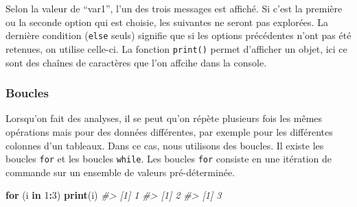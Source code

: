 \documentclass[]{article}
\newenvironment{Shaded}{\begin{snugshade}}{\end{snugshade}}
\newcommand{\CommentTok}[1]{\textcolor[rgb]{0.56,0.35,0.01}{\textit{#1}}}
\newcommand{\ControlFlowTok}[1]{\textcolor[rgb]{0.13,0.29,0.53}{\textbf{#1}}}
\newcommand{\DecValTok}[1]{\textcolor[rgb]{0.00,0.00,0.81}{#1}}
\newcommand{\KeywordTok}[1]{\textcolor[rgb]{0.13,0.29,0.53}{\textbf{#1}}}
\newcommand{\NormalTok}[1]{#1}
\newcommand{\OperatorTok}[1]{\textcolor[rgb]{0.81,0.36,0.00}{\textbf{#1}}}
\newcommand{\StringTok}[1]{\textcolor[rgb]{0.31,0.60,0.02}{#1}}
\begin{document}
\begin{Shaded}
\end{Shaded}

Selon la valeur de ``var1'', l'un des trois messages est affiché.
Si c'est la première ou la seconde option qui est choisie, les suivantes ne seront pas explorées. La dernière condition (\texttt{else} seuls) signifie que si les options précédentes n'ont pas été retenues, on utilise celle-ci.
La fonction \texttt{print()} permet d'afficher un objet, ici ce sont des chaînes de caractères que l'on affcihe dans la console.

\hypertarget{boucles}{%
\subsubsection*{Boucles}\label{boucles}}

Lorsqu'on fait des analyses, il se peut qu'on répète plusieurs fois les mêmes opérations mais pour des données différentes, par exemple pour les différentes colonnes d'un tableaux. Dans ce cas, nous utilisons des boucles. Il existe les boucles \texttt{for} et les boucles \texttt{while}. Les boucles \texttt{for} consiste en une itération de commande sur un ensemble de valeurs pré-déterminée.

\begin{Shaded}
\begin{Highlighting}[]
\ControlFlowTok{for}\NormalTok{ (i }\ControlFlowTok{in} \DecValTok{1}\OperatorTok{:}\DecValTok{3}\NormalTok{) }\KeywordTok{print}\NormalTok{(i)}
\CommentTok{#> [1] 1}
\CommentTok{#> [1] 2}
\CommentTok{#> [1] 3}
\end{Highlighting}
\end{Shaded}
\end{document}
